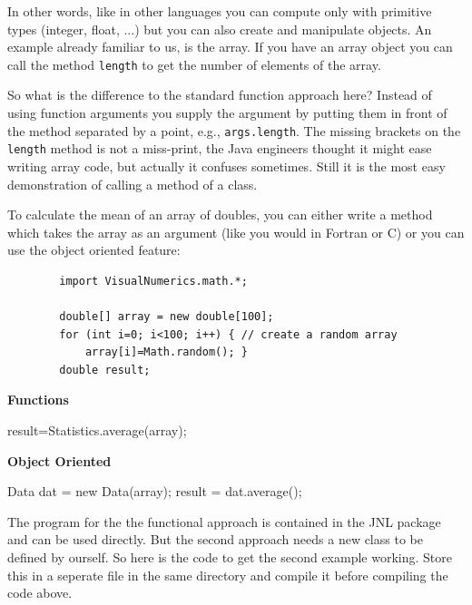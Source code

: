 In other words, like in other languages you can compute only with
primitive types (integer, float, ...) but you can also create and
manipulate objects. An example already familiar to us, is the  array. 
If you have an array 
object you can call the method \verb|length| to get the number of
elements of the array. 

So what is the difference to the standard function approach here?
Instead of using function arguments you supply the argument by 
putting them in front of the method separated by a point, e.g., 
\verb|args.length|. The missing brackets on the \verb|length| method
is not a miss-print, the Java engineers thought it might ease writing
array code, but actually it confuses sometimes. Still it is the
most easy demonstration of calling a method of a class.

To calculate the mean of an array of doubles, you can
either write a method which takes the array as an argument (like you would
in Fortran or C) or you can use the object
oriented feature:
\begin{small}
\begin{verbatim}
        import VisualNumerics.math.*;

        double[] array = new double[100]; 
        for (int i=0; i<100; i++) { // create a random array
            array[i]=Math.random(); }
        double result;
\end{verbatim}

\noindent \begin{minipage}{.53\textwidth}
\textbf{Functions}
\begin{sverbatim}
  
 result=Statistics.average(array); 
\end{sverbatim}
\end{minipage}
\begin{minipage}{.41\textwidth}
\textbf{Object Oriented}
\begin{sverbatim}
 Data dat = new Data(array); 
 result = dat.average();
\end{sverbatim}
\end{minipage}
\end{small}
\vspace{.2cm}

The program for the the functional approach is contained in the JNL
package and can be used directly. But the second approach needs a 
new class to be defined by ourself. So here is the code to get the 
second example working. Store this in a seperate file in the same 
directory and compile it before compiling the code above.

